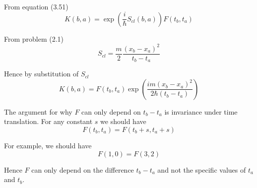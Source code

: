 


From equation (3.51)
\begin{equation*}
K(b,a)=\exp\left(\frac{i}{\hbar}S_{cl}(b,a)\right)F(t_b,t_a)
\end{equation*}

From problem (2.1)
\begin{equation*}
S_{cl}=\frac{m}{2}\frac{(x_b-x_a)^2}{t_b-t_a}
\end{equation*}

Hence by substitution of $S_{cl}$
\begin{equation*}
K(b,a)=F(t_b,t_a)\exp\left(\frac{im(x_b-x_a)^2}{2\hbar(t_b-t_a)}\right)
\end{equation*}

The argument for why $F$ can only depend on $t_b-t_a$ is invariance under time translation.
For any constant $s$ we should have
\begin{equation*}
F(t_b,t_a)=F(t_b+s,t_a+s)
\end{equation*}

For example, we should have
\begin{equation*}
F(1,0)=F(3,2)
\end{equation*}

Hence $F$ can only depend on the difference $t_b-t_a$ and not the specific values of $t_a$ and $t_b$.


